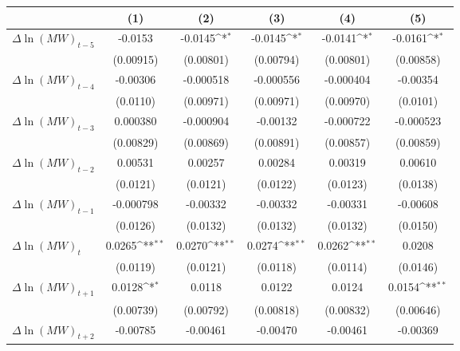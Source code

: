 {
\def\sym#1{\ifmmode^{#1}\else\(^{#1}\)\fi}
\begin{tabular}{l*{5}{c}}
\hline\hline
          &\multicolumn{1}{c}{(1)}         &\multicolumn{1}{c}{(2)}         &\multicolumn{1}{c}{(3)}         &\multicolumn{1}{c}{(4)}         &\multicolumn{1}{c}{(5)}         \\
\hline
$\Delta \ln(MW)_{t-5}$&  -0.0153         &  -0.0145\sym{*}  &  -0.0145\sym{*}  &  -0.0141\sym{*}  &  -0.0161\sym{*}  \\
          &(0.00915)         &(0.00801)         &(0.00794)         &(0.00801)         &(0.00858)         \\
[1em]
$\Delta \ln(MW)_{t-4}$& -0.00306         &-0.000518         &-0.000556         &-0.000404         & -0.00354         \\
          & (0.0110)         &(0.00971)         &(0.00971)         &(0.00970)         & (0.0101)         \\
[1em]
$\Delta \ln(MW)_{t-3}$& 0.000380         &-0.000904         & -0.00132         &-0.000722         &-0.000523         \\
          &(0.00829)         &(0.00869)         &(0.00891)         &(0.00857)         &(0.00859)         \\
[1em]
$\Delta \ln(MW)_{t-2}$&  0.00531         &  0.00257         &  0.00284         &  0.00319         &  0.00610         \\
          & (0.0121)         & (0.0121)         & (0.0122)         & (0.0123)         & (0.0138)         \\
[1em]
$\Delta \ln(MW)_{t-1}$&-0.000798         & -0.00332         & -0.00332         & -0.00331         & -0.00608         \\
          & (0.0126)         & (0.0132)         & (0.0132)         & (0.0132)         & (0.0150)         \\
[1em]
$\Delta \ln(MW)_{t}$&   0.0265\sym{**} &   0.0270\sym{**} &   0.0274\sym{**} &   0.0262\sym{**} &   0.0208         \\
          & (0.0119)         & (0.0121)         & (0.0118)         & (0.0114)         & (0.0146)         \\
[1em]
$\Delta \ln(MW)_{t+1}$&   0.0128\sym{*}  &   0.0118         &   0.0122         &   0.0124         &   0.0154\sym{**} \\
          &(0.00739)         &(0.00792)         &(0.00818)         &(0.00832)         &(0.00646)         \\
[1em]
$\Delta \ln(MW)_{t+2}$& -0.00785         & -0.00461         & -0.00470         & -0.00461         & -0.00369         \\

\end{tabular}}
